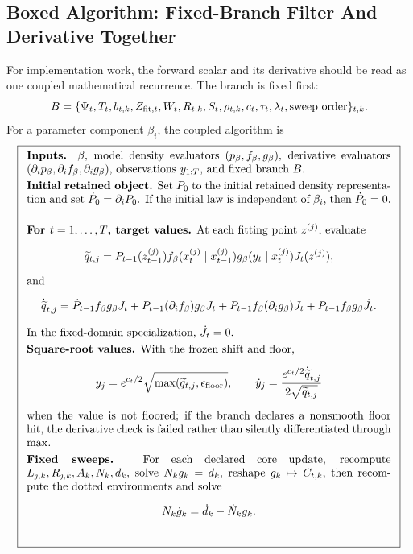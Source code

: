 \documentclass[11pt]{article}
\numberwithin{equation}{section}
\begin{document}
\subsection{Boxed Algorithm: Fixed-Branch Filter And Derivative Together}

For implementation work, the forward scalar and its derivative should be read
as one coupled mathematical recurrence.  The branch is fixed first:
\begin{equation}
    B
    =
    \{\Psi_t,T_t,b_{t,k},Z_{{\rm fit},t},W_t,R_{t,k},S_t,
    \rho_{t,k},c_t,\tau_t,\lambda_t,\text{sweep order}\}_{t,k}.
    \label{eq:p26-box-deriv-1}
\end{equation}
For a parameter component \(\beta_i\), the coupled algorithm is
\begin{equation}
\boxed{
\begin{array}{p{0.94\linewidth}}
\textbf{Inputs.}
\(\beta\), model density evaluators
\((p_\beta,f_\beta,g_\beta)\), derivative evaluators
\((\partial_i p_\beta,\partial_i f_\beta,\partial_i g_\beta)\), observations
\(y_{1:T}\), and fixed branch \(B\).
\\[1mm]
\textbf{Initial retained object.}
Set \(P_0\) to the initial retained density representation and set
\(\dot P_0=\partial_i P_0\).  If the initial law is independent of
\(\beta_i\), then \(\dot P_0=0\).
\\[1mm]
\textbf{For \(t=1,\ldots,T\), target values.}
At each fitting point \(z^{(j)}\), evaluate
\[
  \widetilde q_{t,j}
  =
  P_{t-1}(z_{t-1}^{(j)})
  f_\beta(x_t^{(j)}\mid x_{t-1}^{(j)})
  g_\beta(y_t\mid x_t^{(j)})J_t(z^{(j)}),
\]
and
\[
  \dot{\widetilde q}_{t,j}
  =
  \dot P_{t-1} f_\beta g_\beta J_t
  +P_{t-1}(\partial_i f_\beta)g_\beta J_t
  +P_{t-1}f_\beta(\partial_i g_\beta)J_t
  +P_{t-1}f_\beta g_\beta \dot J_t .
\]
In the fixed-domain specialization, \(\dot J_t=0\).
\\[1mm]
\textbf{Square-root values.}
With the frozen shift and floor,
\[
  y_j=e^{c_t/2}\sqrt{\max(\widetilde q_{t,j},\epsilon_{\rm floor})},
  \qquad
  \dot y_j=
  \frac{e^{c_t/2}\dot{\widetilde q}_{t,j}}
       {2\sqrt{\widetilde q_{t,j}}}
\]
when the value is not floored; if the branch declares a nonsmooth floor hit,
the derivative check is failed rather than silently differentiated through
\(\max\).
\\[1mm]
\textbf{Fixed sweeps.}
For each declared core update, recompute \(L_{j,k},R_{j,k},A_k,N_k,d_k\),
solve \(N_kg_k=d_k\), reshape \(g_k\mapsto C_{t,k}\), then recompute the
dotted environments and solve
\[
    N_k\dot g_k=\dot d_k-\dot N_kg_k.
\]
\end{array}}
\end{equation}
\end{document}
